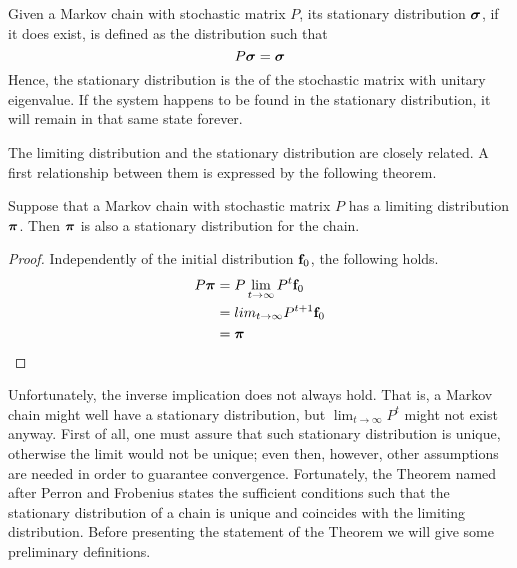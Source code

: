 \begin{ndef} 
    Given a Markov chain with stochastic matrix $P$, its stationary distribution $\boldsymbol{\sigma}$, if it does exist, is defined as the distribution such that
    \begin{equation}
        P \boldsymbol{\sigma} = \boldsymbol{\sigma}
    \end{equation}
    Hence, the stationary distribution is the  of the stochastic matrix with unitary eigenvalue. If the system happens to be found in the stationary distribution, it will remain in that same state forever.
\end{ndef}
The limiting distribution and the stationary distribution are closely related. A first relationship between them is expressed by the following theorem.

\begin{theorem} \label{th:limit-stat}
    Suppose that a Markov chain with stochastic matrix $P$ has a limiting distribution $\boldsymbol{\pi}$. Then $\boldsymbol{\pi}$ is also a stationary distribution for the chain.
\end{theorem}
\begin{proof}
    Independently of the initial distribution $\mathbf{f}_0$, the following holds.
    \begin{align}
        P \boldsymbol{\pi}
         & = P \lim_{t \rightarrow \infty} P^t \mathbf{f}_0  \\
         & = lim_{t \rightarrow \infty} P^{t+1} \mathbf{f}_0 \\
         & = \boldsymbol{\pi}
    \end{align}
\end{proof}
Unfortunately, the inverse implication does not always hold. That is, a Markov chain might well have a stationary distribution, but $\lim_{t \rightarrow \infty} P^t$ might not exist anyway. First of all, one must assure that such stationary distribution is unique, otherwise the limit would not be unique; even then, however, other assumptions are needed in order to guarantee convergence. Fortunately, the Theorem named after Perron and Frobenius states the sufficient conditions such that the stationary distribution of a chain is unique and coincides with the limiting distribution. Before presenting the statement of the Theorem we will give some preliminary definitions. 

